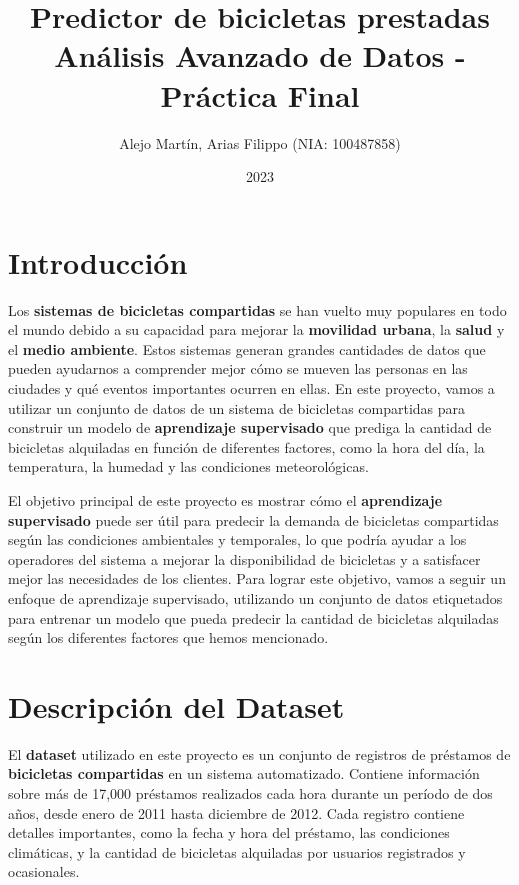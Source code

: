\documentclass{wsdcr}
\title{%
    Predictor de bicicletas prestadas \\
    \large Análisis Avanzado de Datos - Práctica Final }
\author{Alejo Martín, Arias Filippo (NIA: 100487858)}
\date{2023}
\begin{document}
\maketitle

\section{Introducción}
Los \textbf{sistemas de bicicletas compartidas} se han vuelto muy populares en todo el mundo debido a su capacidad para mejorar la \textbf{movilidad urbana}, la \textbf{salud} y el \textbf{medio ambiente}. Estos sistemas generan grandes cantidades de datos que pueden ayudarnos a comprender mejor cómo se mueven las personas en las ciudades y qué eventos importantes ocurren en ellas. En este proyecto, vamos a utilizar un conjunto de datos de un sistema de bicicletas compartidas para construir un modelo de \textbf{aprendizaje supervisado} que prediga la cantidad de bicicletas alquiladas en función de diferentes factores, como la hora del día, la temperatura, la humedad y las condiciones meteorológicas.

El objetivo principal de este proyecto es mostrar cómo el \textbf{aprendizaje supervisado} puede ser útil para predecir la demanda de bicicletas compartidas según las condiciones ambientales y temporales, lo que podría ayudar a los operadores del sistema a mejorar la disponibilidad de bicicletas y a satisfacer mejor las necesidades de los clientes. Para lograr este objetivo, vamos a seguir un enfoque de aprendizaje supervisado, utilizando un conjunto de datos etiquetados para entrenar un modelo que pueda predecir la cantidad de bicicletas alquiladas según los diferentes factores que hemos mencionado.

\section{Descripción del Dataset}
El \textbf{dataset} utilizado en este proyecto es un conjunto de registros de préstamos de \textbf{bicicletas compartidas} en un sistema automatizado. Contiene información sobre más de 17,000 préstamos realizados cada hora durante un período de dos años, desde enero de 2011 hasta diciembre de 2012. Cada registro contiene detalles importantes, como la fecha y hora del préstamo, las condiciones climáticas, y la cantidad de bicicletas alquiladas por usuarios registrados y ocasionales.
\end{document}
